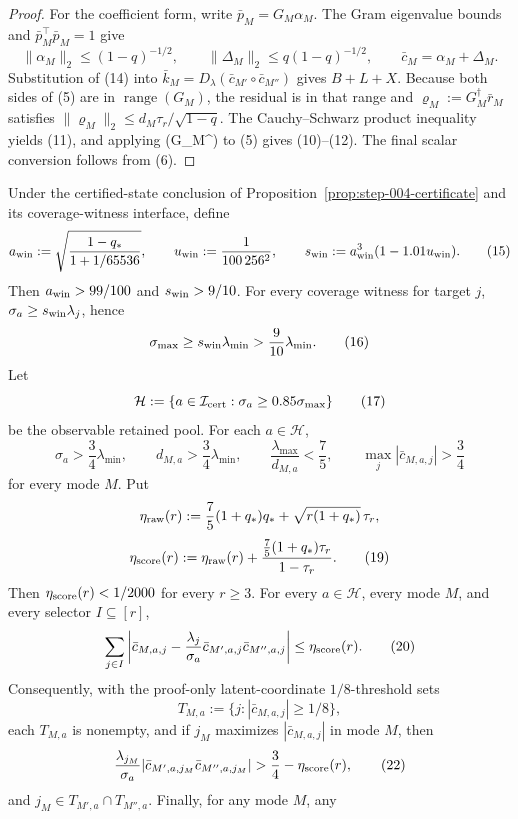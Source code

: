 \begin{proposition}
\begin{proof}
For the coefficient form, write $\bar p_M=G_M\alpha_M$.  The Gram
eigenvalue bounds and $\bar p_M^\top\bar p_M=1$ give
\[
\|\alpha_M\|_2\le(1-q)^{-1/2},\qquad
\|\Delta_M\|_2\le q(1-q)^{-1/2},\qquad
\bar c_M=\alpha_M+\Delta_M.
\tag{14}
\]
Substitution of (14) into
$\bar k_M=D_\lambda(\bar c_{M'}\circ\bar c_{M''})$ gives $B+L+X$.
Because both sides of (5) are in $\operatorname{range}(G_M)$, the residual
is in that range and $\varrho_M:=G_M^\dagger\bar r_M$ satisfies
$\|\varrho_M\|_2\le d_M\tau_r/\sqrt{1-q}$.  The Cauchy--Schwarz
product inequality yields (11), and applying (G\_M^\dagger) to (5) gives
(10)--(12).  The final scalar conversion follows from (6). 


\end{proof}
\end{proposition}
\begin{proposition}\label{prop:step-005-threshold-ledger}
Under the certified-state conclusion of Proposition~\ref{prop:step-004-certificate}
and its coverage-witness interface, define
\[
a_{\rm win}:=\sqrt{\frac{1-q_*}{1+1/65536}},\qquad
u_{\rm win}:=\frac1{100\,256^2},\qquad
s_{\rm win}:=a_{\rm win}^3(1-1.01u_{\rm win}).
\tag{15}
\]
Then $a_{\rm win}>99/100$ and $s_{\rm win}>9/10$.  For every coverage
witness for target $j$, $\sigma_a\ge s_{\rm win}\lambda_j$, hence
\[
\sigma_{\max}\ge s_{\rm win}\lambda_{\min}>\frac9{10}\lambda_{\min}.
\tag{16}
\]
Let
\[
\mathcal H:=\{a\in\mathcal I_{\rm cert}:\sigma_a\ge0.85\sigma_{\max}\}
\tag{17}
\]
be the observable retained pool.  For each $a\in\mathcal H$,
\[
\sigma_a>\frac34\lambda_{\min},\qquad
d_{M,a}>\frac34\lambda_{\min},\qquad
\frac{\lambda_{\max}}{d_{M,a}}<\frac75,\qquad
\max_j|\bar c_{M,a,j}|>\frac34
\tag{18}
\]
for every mode $M$.  Put
\[
\eta_{\rm raw}(r):=\frac75(1+q_*)q_*+
\sqrt{r(1+q_*)}\,\tau_r,
\]
\[
\eta_{\rm score}(r):=\eta_{\rm raw}(r)+
\frac{\frac75(1+q_*)\tau_r}{1-\tau_r}.
\tag{19}
\]
Then $\eta_{\rm score}(r)<1/2000$ for every $r\ge3$.  For every
$a\in\mathcal H$, every mode $M$, and every selector $I\subseteq[r]$,
\[
\sum_{j\in I}\left|
\bar c_{M,a,j}-\frac{\lambda_j}{\sigma_a}
\bar c_{M',a,j}\bar c_{M'',a,j}
\right|\le\eta_{\rm score}(r).
\tag{20}
\]
Consequently, with the proof-only latent-coordinate $1/8$-threshold sets
\[
T_{M,a}:=\{j:|\bar c_{M,a,j}|\ge1/8\},
\tag{21}
\]
each $T_{M,a}$ is nonempty, and if $j_M$ maximizes
$|\bar c_{M,a,j}|$ in mode $M$, then
\[
\frac{\lambda_{j_M}}{\sigma_a}
|\bar c_{M',a,j_M}\bar c_{M'',a,j_M}|
>\frac34-\eta_{\rm score}(r),
\tag{22}
\]
and $j_M\in T_{M',a}\cap T_{M'',a}$.  Finally, for any mode $M$, any

\end{proposition}
